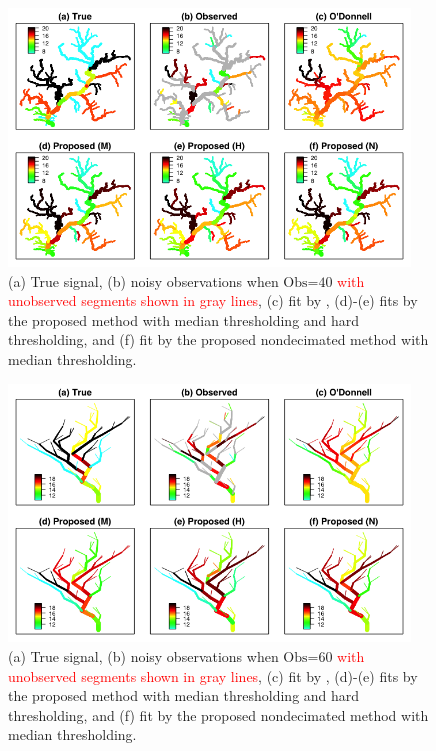 \documentclass[11pt,titlepage]{article}
\begin{document}
\begin{figure}
	\centering\includegraphics[width=0.95\textwidth]{Stream_Result/SLifting_Comp_02.png}
	\vspace{-4mm}\caption{(a) True signal, (b) noisy observations when $\text{Obs=40}$ \textcolor{red}{with unobserved segments shown in gray lines}, (c) fit by \cite{ODonnell2014}, (d)-(e) fits by the proposed method with median thresholding and hard thresholding, and (f) fit by the proposed nondecimated method with median thresholding.}
	\label{fig:streamsimresult}
\end{figure}


\begin{figure}
	\centering\includegraphics[width=0.95\textwidth]{Stream_Result/SLifting_Comp_03.png}
	\vspace{-4mm}\caption{(a) True signal, (b) noisy observations when $\text{Obs=60}$ \textcolor{red}{with unobserved segments shown in gray lines}, (c) fit by \cite{ODonnell2014}, (d)-(e) fits by the proposed method with median thresholding and hard thresholding, and (f) fit by the proposed nondecimated method with median thresholding.}
	\label{fig:streamsimresult2}
\end{figure}
\end{document}
